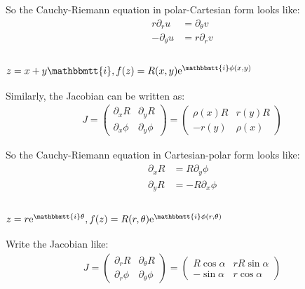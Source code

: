 \documentclass[]{ctexart}
\newcommand{\mi}{\mathbbmtt{i}}
\newcommand{\pa}{\partial}
\newcommand{\me}{\mathrm{e}}
\begin{document}
				So the Cauchy-Riemann equation in polar-Cartesian form looks like: 
					\begin{equation*}
					\begin{aligned}
						r\pa_ru&=\pa _{\theta}v\\
						-\pa_{\theta}u&=r\pa_rv
					\end{aligned}
					\end{equation*}
				
			\subsubsection{$z=x+y\mi, f(z)=R(x,y)\me ^{\mi \phi (x,y)}$}
				Similarly, the Jacobian can be written as:
					\begin{equation*}
					\begin{aligned}
						J=
						\begin{pmatrix}
							\pa_xR & \pa_{y}R\\
							\pa_x\phi & \pa_{y}\phi
						\end{pmatrix}
						=
						\begin{pmatrix}
							\rho(x)R & r(y)R\\
							-r(y) & \rho(x)
						\end{pmatrix}
					\end{aligned}
					\end{equation*}
				
				So the Cauchy-Riemann equation in Cartesian-polar form looks like:
					\begin{equation*}
					\begin{aligned}
						\pa_xR&=R\pa_y\phi\\
						\pa_{y}R&=-R\pa_{x}\phi
					\end{aligned}
					\end{equation*}
			
			\subsubsection{$z=r\me ^{\mi \theta},f(z)=R(r,\theta)\me ^{\mi \phi(r,\theta)}$}
				Write the Jacobian like:
					\begin{equation*}
					\begin{aligned}
						J=
						\begin{pmatrix}
							\pa_rR & \pa_{\theta}R\\
							\pa_r\phi & \pa_{\theta}\phi
						\end{pmatrix}
						=
						\begin{pmatrix}
							R\cos\alpha & rR\sin\alpha\\
							-\sin\alpha & r\cos\alpha 
						\end{pmatrix}
					\end{aligned}
					\end{equation*}
					
\end{document}
